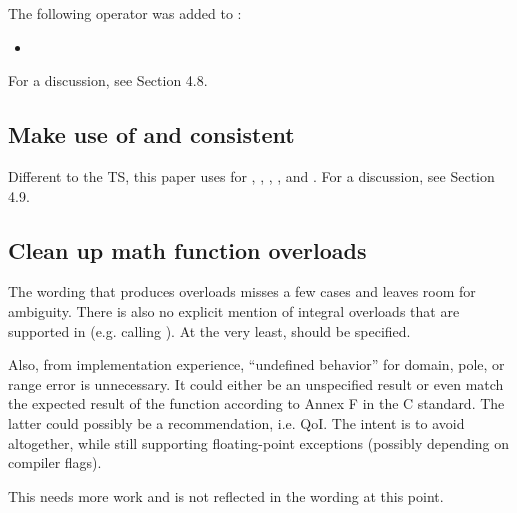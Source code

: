 The following operator was added to \simd:
\begin{itemize}
  \item {}
\end{itemize}

For a discussion, see  Section 4.8.

\subsection{Make use of  and  consistent}

Different to the TS, this paper uses  for
\stdx\simdabi{}, \stdx{},
\stdx{}, \stdx{}, and
\stdx\simdabi{}.
For a discussion, see  Section 4.9.

\subsection{Clean up math function overloads}
The wording that produces  overloads misses a few cases and leaves room for ambiguity.
There is also no explicit mention of integral overloads that are supported in  (e.g.  calling ).
At the very least,  should be specified.

Also, from implementation experience, ``undefined behavior'' for domain, pole,
or range error is unnecessary.
It could either be an unspecified result or even match the expected result of
the function according to Annex F in the C standard.
The latter could possibly be a recommendation, i.e. QoI.
The intent is to avoid  altogether, while still supporting
floating-point exceptions (possibly depending on compiler flags).

This needs more work and is not reflected in the wording at this point.

